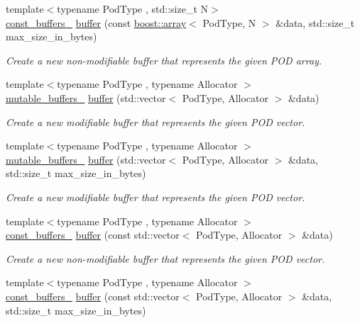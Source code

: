\begin{DoxyCompactItemize}
{\footnotesize template$<$typename Pod\+Type , std\+::size\+\_\+t N$>$ }\\\hyperlink{classasio_1_1const__buffers__1}{const\+\_\+buffers\+\_} \hyperlink{group__buffer_gac7e496b244e3999f2035c29043cd2ff9}{buffer} (const \hyperlink{classboost_1_1array}{boost\+::array}$<$ Pod\+Type, N $>$ \&data, std\+::size\+\_\+t max\+\_\+size\+\_\+in\+\_\+bytes)
\begin{DoxyCompactList}\small\item\em Create a new non-\/modifiable buffer that represents the given P\+O\+D array. \end{DoxyCompactList}\item 
{\footnotesize template$<$typename Pod\+Type , typename Allocator $>$ }\\\hyperlink{classasio_1_1mutable__buffers__1}{mutable\+\_\+buffers\+\_} \hyperlink{group__buffer_ga382ee4d2d0dd90e88e374e4344302749}{buffer} (std\+::vector$<$ Pod\+Type, Allocator $>$ \&data)
\begin{DoxyCompactList}\small\item\em Create a new modifiable buffer that represents the given P\+O\+D vector. \end{DoxyCompactList}\item 
{\footnotesize template$<$typename Pod\+Type , typename Allocator $>$ }\\\hyperlink{classasio_1_1mutable__buffers__1}{mutable\+\_\+buffers\+\_} \hyperlink{group__buffer_gad0a0b6813e25e7bcce7fcfe32a5cdab9}{buffer} (std\+::vector$<$ Pod\+Type, Allocator $>$ \&data, std\+::size\+\_\+t max\+\_\+size\+\_\+in\+\_\+bytes)
\begin{DoxyCompactList}\small\item\em Create a new modifiable buffer that represents the given P\+O\+D vector. \end{DoxyCompactList}\item 
{\footnotesize template$<$typename Pod\+Type , typename Allocator $>$ }\\\hyperlink{classasio_1_1const__buffers__1}{const\+\_\+buffers\+\_} \hyperlink{group__buffer_gaa908d4c98b0745c8c51540e153627f44}{buffer} (const std\+::vector$<$ Pod\+Type, Allocator $>$ \&data)
\begin{DoxyCompactList}\small\item\em Create a new non-\/modifiable buffer that represents the given P\+O\+D vector. \end{DoxyCompactList}\item 
{\footnotesize template$<$typename Pod\+Type , typename Allocator $>$ }\\\hyperlink{classasio_1_1const__buffers__1}{const\+\_\+buffers\+\_} \hyperlink{group__buffer_gad172ef969f244d265d3cfcfea727b904}{buffer} (const std\+::vector$<$ Pod\+Type, Allocator $>$ \&data, std\+::size\+\_\+t max\+\_\+size\+\_\+in\+\_\+bytes)

\end{DoxyCompactItemize}
